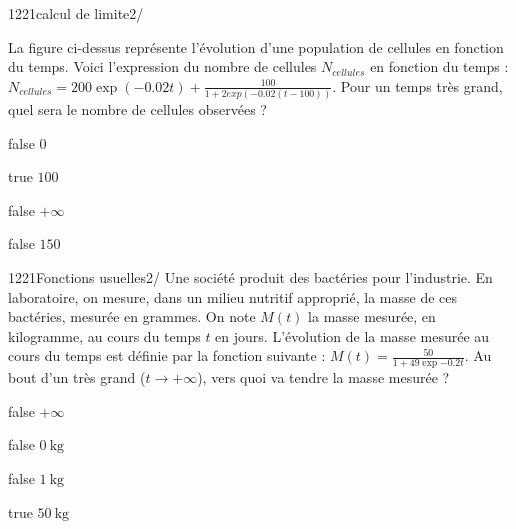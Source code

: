 			\begin{question}{1221}{calcul de limite}{2}{/}
			\begin{figure}
        		\end{figure}
                La figure ci-dessus représente l'évolution d'une population de cellules en fonction du temps. Voici l'expression du nombre de cellules $N_{cellules}$ en fonction du temps : $N_{cellules}= 200\exp(-0.02t)+\frac{100}{1+2exp(-0.02(t-100))}$. Pour un temps très grand, quel sera le nombre de cellules observées ? 
            \end{question}     
				\begin{reponses}
            	\item[false]  $0 $ 
            	\item[true]   $100 $ 
                \item[false]   $+\infty $ 
                \item[false]  $150 $ 
                \end{reponses}
        	\begin{question}{1221}{Fonctions usuelles}{2}{/}
				Une société produit des bactéries pour l’industrie. En laboratoire, on mesure, dans un milieu nutritif approprié, la masse de ces bactéries, mesurée en grammes. On note $M(t)$ la masse mesurée, en kilogramme, au cours du temps $t$ en jours. L'évolution de la masse mesurée au cours du temps est définie par la fonction suivante : $M(t) = \frac{50}{1+49\exp{-0.2t}}$. Au bout d'un très grand ($t \to +\infty$), vers quoi va tendre la masse mesurée ?
            \end{question}
            \begin{reponses}
            	\item[false] $+\infty$
            	\item[false] $\SI{0}{\kilo\gram}$
                \item[false] $\SI{1}{\kilo\gram}$
                \item[true] $\SI{50}{\kilo\gram}$
            \end{reponses}

